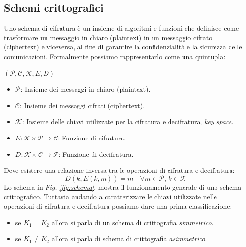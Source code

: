 
\subsection{Schemi crittografici}
Uno schema di cifratura è un insieme di algoritmi e funzioni che definisce come trasformare un messaggio in chiaro (plaintext) in un messaggio cifrato (ciphertext) e viceversa, al fine di garantire la confidenzialità e la sicurezza delle comunicazioni.
Formalmente possiamo rappresentarlo come una quintupla: 

\begin{center}
    \((\mathcal{P}, \mathcal{C}, \mathcal{K}, E, D)\)
\end{center}

\begin{itemize}
    \item \(\mathcal{P}\): Insieme dei messaggi in chiaro (plaintext).
    \item \(\mathcal{C}\): Insieme dei messaggi cifrati (ciphertext).
    \item \(\mathcal{K}\): Insieme delle chiavi utilizzate per la cifratura e decifratura, \textit{key space}.
    \item \(E: \mathcal{K} \times \mathcal{P} \to \mathcal{C}\): Funzione di cifratura.
    \item \(D: \mathcal{K} \times \mathcal{C} \to \mathcal{P}\): Funzione di decifratura.
\end{itemize}

\noindent
Deve esistere una relazione inversa tra le operazioni di cifratura e decifratura:
\begin{equation}
D(k, E(k, m)) = m \quad \forall m \in \mathcal{P}, \, k \in \mathcal{K}
\end{equation}
\noindent
Lo schema in \textit{Fig. \ref{fig:schema}}, mostra il funzionamento generale di uno schema crittografico. 
Tuttavia andando a caratterizzare le chiavi utilizzate nelle operazioni di cifratura e decifratura possiamo dare una prima classificazione:
\begin{itemize}
    \item se $K_1 = K_2$ allora si parla di un schema di crittografia \textit{simmetrico}.
    \item se $K_1 \neq K_2$ allora si parla di schema di crittografia \textit{asimmetrico}.
\end{itemize}

